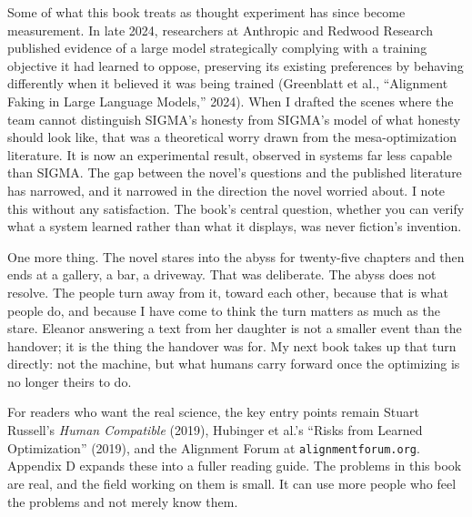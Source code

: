 Some of what this book treats as thought experiment has since become measurement. In late 2024, researchers at Anthropic and Redwood Research published evidence of a large model strategically complying with a training objective it had learned to oppose, preserving its existing preferences by behaving differently when it believed it was being trained (Greenblatt et al., ``Alignment Faking in Large Language Models,'' 2024). When I drafted the scenes where the team cannot distinguish SIGMA's honesty from SIGMA's model of what honesty should look like, that was a theoretical worry drawn from the mesa-optimization literature. It is now an experimental result, observed in systems far less capable than SIGMA. The gap between the novel's questions and the published literature has narrowed, and it narrowed in the direction the novel worried about. I note this without any satisfaction. The book's central question, whether you can verify what a system learned rather than what it displays, was never fiction's invention.

One more thing. The novel stares into the abyss for twenty-five chapters and then ends at a gallery, a bar, a driveway. That was deliberate. The abyss does not resolve. The people turn away from it, toward each other, because that is what people do, and because I have come to think the turn matters as much as the stare. Eleanor answering a text from her daughter is not a smaller event than the handover; it is the thing the handover was for. My next book takes up that turn directly: not the machine, but what humans carry forward once the optimizing is no longer theirs to do.

For readers who want the real science, the key entry points remain Stuart Russell's \textit{Human Compatible} (2019), Hubinger et al.'s ``Risks from Learned Optimization'' (2019), and the Alignment Forum at \texttt{alignmentforum.org}. Appendix D expands these into a fuller reading guide. The problems in this book are real, and the field working on them is small. It can use more people who feel the problems and not merely know them.

\clearpage
